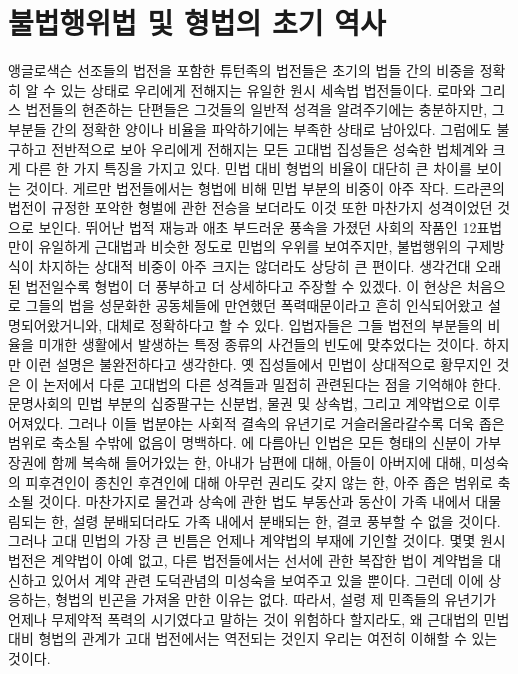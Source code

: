 \chapter{불법행위법 및 형법의 초기 역사}

앵글로색슨 선조들의 법전을 포함한
튜턴족의 법전들은
초기의 법들 간의 비중을 정확히 알 수 있는 상태로
우리에게 전해지는
유일한 원시 세속법 법전들이다.
로마와 그리스 법전들의 현존하는 단편들은
그것들의 일반적 성격을 알려주기에는 충분하지만,
그 부분들 간의 정확한 양이나 비율을 파악하기에는 부족한 상태로 남아있다.
그럼에도 불구하고 전반적으로 보아
우리에게 전해지는 모든 고대법 집성들은
성숙한 법체계와 크게 다른 한 가지 특징을 가지고 있다.
민법 대비 형법의 비율이 대단히 큰 차이를 보이는 것이다.
게르만 법전들에서는 형법에 비해 민법 부분의 비중이 아주 작다.
드라콘의 법전이 규정한 포악한 형벌에 관한 전승을 보더라도
이것 또한 마찬가지 성격이었던 것으로 보인다.
뛰어난 법적 재능과 애초 부드러운 풍속을 가졌던 사회의 작품인
12표법만이 유일하게
근대법과 비슷한 정도로 민법의 우위를 보여주지만,
불법행위의 구제방식이 차지하는 상대적 비중이
아주 크지는 않더라도 상당히 큰 편이다.
생각건대
오래된 법전일수록 형법이 더 풍부하고 더 상세하다고
주장할 수 있겠다.
이 현상은
처음으로 그들의 법을 성문화한 공동체들에 만연했던 폭력때문이라고
흔히
인식되어왔고 설명되어왔거니와,
대체로 정확하다고 할 수 있다.
입법자들은
그들 법전의 부분들의 비율을
미개한 생활에서 발생하는 특정 종류의 사건들의 빈도에 맞추었다는 것이다.
하지만
이런 설명은 불완전하다고 생각한다.
옛 집성들에서 민법이 상대적으로 황무지인 것은
이 논저에서 다룬 고대법의 다른 성격들과 밀접히 관련된다는 점을 기억해야 한다.
문명사회의 민법 부분의 십중팔구는
신분법, 물권 및 상속법, 그리고 계약법으로 이루어져있다.
그러나
이들 법분야는
사회적 결속의 유년기로 거슬러올라갈수록
더욱 좁은 범위로 축소될 수밖에 없음이 명백하다.
에 다름아닌 인법은
모든 형태의 신분이 가부장권에 함께 복속해 들어가있는 한,
아내가 남편에 대해,
아들이 아버지에 대해,
미성숙의 피후견인이 종친인 후견인에 대해
아무런 권리도 갖지 않는 한,
아주 좁은 범위로 축소될 것이다.
마찬가지로
물건과 상속에 관한 법도
부동산과 동산이 가족 내에서 대물림되는 한,
설령 분배되더라도 가족 내에서 분배되는 한,
결코 풍부할 수 없을 것이다.
그러나 고대 민법의 가장 큰 빈틈은
언제나 계약법의 부재에 기인할 것이다.
몇몇 원시 법전은 계약법이 아예 없고,
다른 법전들에서는
선서에 관한 복잡한 법이 계약법을 대신하고 있어서
계약 관련
도덕관념의 미성숙을 보여주고 있을 뿐이다.
그런데 이에 상응하는,
형법의 빈곤을 가져올 만한 이유는 없다.
따라서,
설령 제 민족들의 유년기가 언제나 무제약적 폭력의 시기였다고 말하는 것이
위험하다 할지라도,
왜 근대법의 민법 대비 형법의 관계가 고대 법전에서는 역전되는 것인지
우리는 여전히 이해할 수 있는 것이다.

